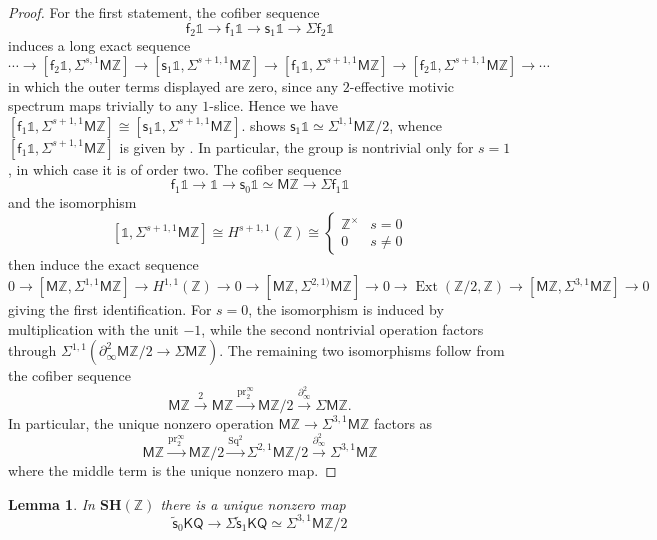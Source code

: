 \documentclass[11pt,hyp,english]{article}
\newcommand{\Z}{\mathbb{Z}}
\newcommand{\unit}{\mathds{1}}
\newcommand{\KQ}{\mathsf{KQ}}
\newcommand{\MZ}{\mathsf{M}\Z}
\newcommand{\HZ}{\mathsf{M}\Z}
\newcommand{\SH}{\mathbf{SH}}
\newcommand{\Ext}{\operatorname{Ext}}
\newcommand{\Sq}{\operatorname{Sq}}
\newcommand{\pr}{\operatorname{pr}}
\newcommand{\s}{\mathsf{s}}
\newcommand{\vs}{\tilde{\mathsf{s}}}
\newcommand{\f}{\mathsf{f}}
\let\iso=\cong
\newtheorem{lemma}[theorem]{Lemma}
\theoremstyle{definition}
\begin{document}
\begin{proof}
For the first statement, the cofiber sequence 
\[ \f_2\unit \to \f_1\unit \to \s_1\unit \to \Sigma\f_2\unit\]
induces a long exact sequence 
\[ \dotsm \to [\f_2\unit,\Sigma^{s,1}\MZ] \to [\s_1\unit,\Sigma^{s+1,1}\MZ] \to [\f_1\unit,\Sigma^{s+1,1}\MZ] \to [\f_2\unit,\Sigma^{s+1,1}\MZ] \to \dotsm \]
in which the outer terms displayed are zero, since any $2$-effective motivic spectrum 
maps trivially to any $1$-slice.
Hence we have $[\f_1\unit,\Sigma^{s+1,1}\MZ]\iso [\s_1\unit,\Sigma^{s+1,1}\MZ]$.
 shows $\s_1\unit\simeq \Sigma^{1,1}\MZ/2$, 
whence $[\f_1\unit,\Sigma^{s+1,1}\MZ]$ is given by .
In particular, the group is nontrivial only for $s=1$, in which case it is of order two.
The cofiber sequence 
\[ \f_1\unit \to \unit \to \s_0\unit\simeq \MZ \to \Sigma\f_1\unit\]
and the isomorphism 
\[ [\unit,\Sigma^{s+1,1}\MZ]\iso H^{s+1,1}(\Z)\iso \begin{cases} \Z^{\times} & s=0\\ 0 & s\neq 0\end{cases} \]
then induce the exact sequence
\[ 0\to [\MZ,\Sigma^{1,1}\MZ] \to H^{1,1}(\Z) \to 0\to [\MZ,\Sigma^{2,1)}\MZ] \to 0 
\to \Ext(\Z/2,\Z) \to [\MZ,\Sigma^{3,1}\MZ] \to 0 \]
giving the first identification.
For $s=0$, the isomorphism is induced by multiplication with the unit $-1$, 
while the second nontrivial operation factors through
$\Sigma^{1,1}(\partial^2_\infty \MZ/2\to \Sigma\MZ)$.
The remaining two isomorphisms follow from the cofiber sequence
\[ \MZ\xrightarrow{2}\MZ \xrightarrow{\pr^\infty_2}{\MZ/2}\xrightarrow{\partial^2_\infty}\Sigma \MZ.\]
In particular, the unique nonzero operation $\MZ\to \Sigma^{3,1}\MZ$ factors as
\[ \MZ \xrightarrow{\pr^\infty_2}\MZ/2 \xrightarrow{\Sq^2} \Sigma^{2,1}\MZ/2 \xrightarrow{\partial^2_\infty} \Sigma^{3,1}\MZ\]
where the middle term is the unique nonzero map.
\end{proof}
\begin{lemma}\label{lem:unique-v-operation}
In $\SH(\Z)$ there is a unique nonzero map
\[ \vs_0\KQ\to \Sigma\vs_1\KQ \simeq \Sigma^{3,1}\MZ/2\]
\end{lemma}
\end{document}
